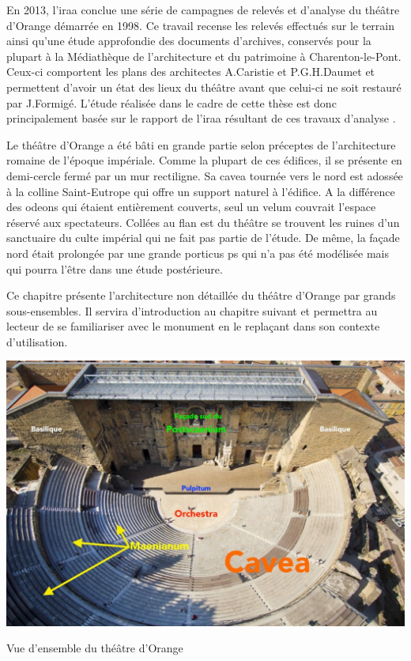 		
		En 2013, l'\gls{iraa} conclue une série de campagnes de relevés et d'analyse du théâtre d'Orange démarrée en 1998. Ce travail recense les relevés effectués sur le terrain ainsi qu'une étude approfondie des documents d'archives, conservés pour la plupart à la Médiathèque de l'architecture et du patrimoine à Charenton-le-Pont. Ceux-ci comportent les plans des architectes A.Caristie et P.G.H.Daumet et permettent d'avoir un état des lieux du théâtre avant que celui-ci ne soit restauré par J.Formigé. L'étude réalisée dans le cadre de cette thèse est donc principalement basée sur le rapport de l'\gls{iraa} résultant de ces travaux d'analyse \cite{orangeTxt}\cite{orangePl}.
		
		Le théâtre d'Orange a été bâti en grande partie selon préceptes de l'architecture romaine de l'époque impériale. Comme la plupart de ces édifices, il se présente en demi-cercle fermé par un mur rectiligne. Sa \gls{cavea} tournée vers le nord est adossée à la colline Saint-Eutrope qui offre un support naturel à l'édifice. A la différence des \glspl{odeon} qui étaient entièrement couverts, seul un \gls{velum} couvrait l'espace réservé aux spectateurs. Collées au flan est du théâtre se trouvent les ruines d'un sanctuaire du culte impérial qui ne fait pas partie de l'étude. De même, la façade nord était prolongée par une grande \gls{porticus ps} qui n'a pas été modélisée mais qui pourra l'être dans une étude postérieure. 
		
		Ce chapitre présente l'architecture non détaillée du théâtre d'Orange par grands sous-ensembles. Il servira d'introduction au chapitre suivant et permettra au lecteur de se familiariser avec le monument en le replaçant dans son contexte d'utilisation.

	\begin{figureth}
			\includegraphics[width=\linewidth]{images/vuensemble}
			\caption[Vue d'ensemble du théâtre d'Orange]{Vue d'ensemble du théâtre d'Orange \footnotemark}
	\end{figureth}

